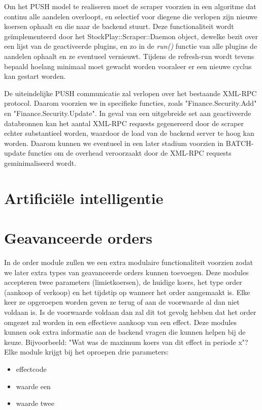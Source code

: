 Om het PUSH model te realiseren moet de scraper voorzien in een algoritme dat continu alle aandelen overloopt, en selectief voor diegene die verlopen zijn nieuwe koersen ophaalt en die naar de backend stuurt. Deze functionaliteit wordt ge\"implementeerd door het StockPlay::Scraper::Daemon object, dewelke bezit over een lijst van de geactiveerde plugins, en zo in de \emph{run()} functie van alle plugins de aandelen ophaalt en ze eventueel vernieuwt. Tijdens de refresh-run wordt tevens bepaald hoelang minimaal moet gewacht worden vooraleer er een nieuwe cyclus kan gestart worden.

De uiteindelijke PUSH communicatie zal verlopen over het bestaande XML-RPC protocol. Daarom voorzien we in specifieke functies, zoals "Finance.Security.Add" en "Finance.Security.Update". In geval van een uitgebreide set aan geactiveerde databronnen kan het aantal XML-RPC requests gegenereerd door de scraper echter substantieel worden, waardoor de load van de backend server te hoog kan worden. Daarom kunnen we eventueel in een later stadium voorzien in BATCH-update functies om de overhead veroorzaakt door de XML-RPC requests geminimaliseerd wordt.


%
%

\chapter{Artifici\"ele intelligentie}


%
%

\chapter{Geavanceerde orders}


In de order module zullen we een extra modulaire functionaliteit voorzien zodat we later extra types van geavanceerde orders kunnen toevoegen.
Deze modules accepteren twee parameters (limietkoersen), de huidige koers, het type order (aankoop of verkoop) en het tijdstip op wanneer het order aangemaakt is. Elke keer ze opgeroepen worden geven ze terug of aan de voorwaarde al dan niet voldaan is. Is de voorwaarde voldaan dan zal dit tot gevolg hebben dat het order omgezet zal worden in een effectieve aankoop van een effect.
Deze modules kunnen ook extra informatie aan de backend vragen die kunnen helpen bij de keuze. Bijvoorbeeld: "Wat was de maximum koers van dit effect in periode x"?
Elke module krijgt bij het oproepen drie parameters:
\begin{itemize}
\item{effectcode}
\item{waarde een}
\item{waarde twee}
\end{itemize}

